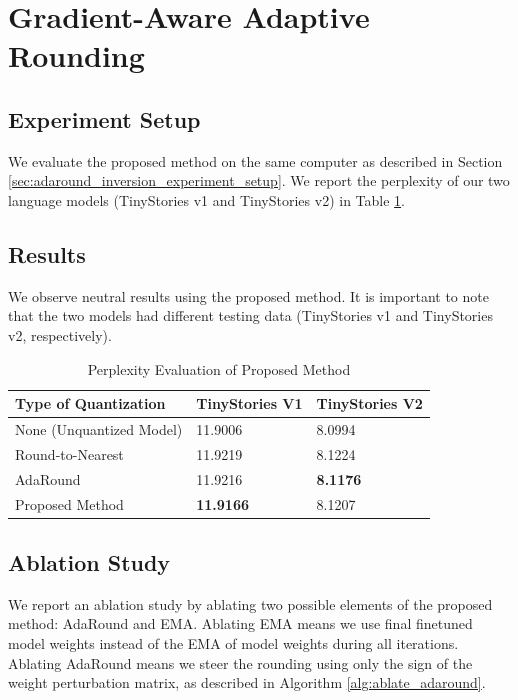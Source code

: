 \documentclass[../main.tex]{subfiles}
\begin{document}
\section{Gradient-Aware Adaptive Rounding}
\subsection{Experiment Setup}
We evaluate the proposed method on the same computer as described in Section \ref{sec:adaround_inversion_experiment_setup}. We report the perplexity of our two language models (TinyStories v1 and TinyStories v2) in Table \ref{tab:gradient_aware_adaround_results}. 

\subsection{Results}
We observe neutral results using the proposed method. It is important to note that the two models had different testing data (TinyStories v1 and TinyStories v2, respectively).

\begin{table}[H]
\centering
\caption{Perplexity Evaluation of Proposed Method}
\label{tab:gradient_aware_adaround_results}
\begin{tabular}{|l|l|l|}
\hline
Type of Quantization & TinyStories V1   & TinyStories V2  \\ \hline
None (Unquantized Model)          & 11.9006          & 8.0994          \\ \hline \hline
Round-to-Nearest     & 11.9219          & 8.1224          \\ \hline
AdaRound             & 11.9216          & \textbf{8.1176} \\ \hline
Proposed Method      & \textbf{11.9166} & 8.1207          \\ \hline
\end{tabular}
\end{table}

\subsection{Ablation Study}
We report an ablation study by ablating two possible elements of the proposed method: AdaRound and EMA. Ablating EMA means we use final finetuned model weights instead of the EMA of model weights during all iterations. Ablating AdaRound means we steer the rounding using only the sign of the weight perturbation matrix, as described in Algorithm \ref{alg:ablate_adaround}.
\end{document}
